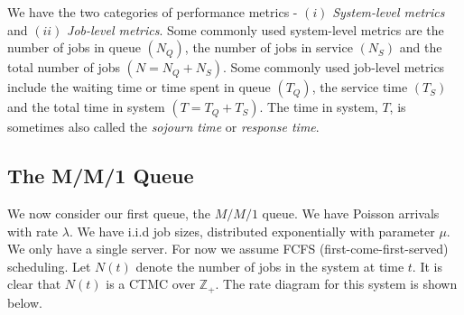 \documentclass[12pt]{article}
\theoremstyle{definition}
\begin{document}

We have the two categories of performance metrics - $(i)$ \emph{System-level metrics} and $(ii)$ \emph{Job-level metrics}. Some commonly used system-level metrics are the number of jobs in queue $(N_Q)$, the number of jobs in service $(N_S)$ and the total number of jobs $(N = N_Q + N_S)$. Some commonly used job-level metrics include the waiting time or time spent in queue $(T_Q)$, the service time $(T_S)$ and the total time in system $(T = T_Q + T_S)$. The time in system, $T$, is sometimes also called the \emph{sojourn time} or \emph{response time}.

\subsection{The M/M/1 Queue}

We now consider our first queue, the $M/M/1$ queue. We have Poisson arrivals with rate $\lambda$. We have i.i.d job sizes, distributed exponentially with parameter $\mu$. We only have a single server. For now we assume FCFS (first-come-first-served) scheduling. Let $N(t)$ denote the number of jobs in the system at time $t$. It is clear that $N(t)$ is a CTMC over $\mathbb{Z}_+$. The rate diagram for this system is shown below. 
\end{document}
